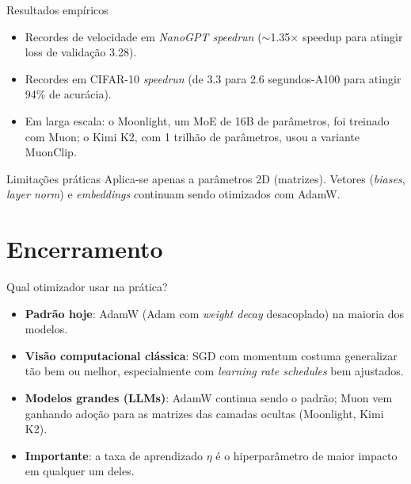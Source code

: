 \documentclass[aspectratio=169,xcolor=dvipsnames]{beamer}
\begin{document}
  \begin{frame}{Resultados empíricos}
    \begin{itemize}
      \item Recordes de velocidade em \textit{NanoGPT speedrun} ($\sim$1.35$\times$ speedup
        para atingir loss de validação 3.28).
      \item Recordes em CIFAR-10 \textit{speedrun} (de 3.3 para 2.6 segundos-A100 para
        atingir 94\% de acurácia).
      \item Em larga escala: o Moonlight, um MoE de 16B de
        parâmetros, foi treinado com Muon; o Kimi K2, com 1
        trilhão de parâmetros, usou a variante MuonClip.
    \end{itemize}
    \vfill
    \begin{alertblock}{Limitações práticas}
      Aplica-se apenas a parâmetros 2D (matrizes). Vetores (\textit{biases}, \textit{layer norm})
      e \textit{embeddings} continuam sendo otimizados com AdamW.
    \end{alertblock}
  \end{frame}

  \section{Encerramento}

  \begin{frame}{Qual otimizador usar na prática?}
    \begin{itemize}
      \item \textbf{Padrão hoje}: AdamW (Adam com \textit{weight decay} desacoplado) na maioria
        dos modelos.
      \item \textbf{Visão computacional clássica}: SGD com momentum costuma generalizar tão
        bem ou melhor, especialmente com \textit{learning rate schedules} bem ajustados.
      \item \textbf{Modelos grandes (LLMs)}: AdamW continua sendo o padrão; Muon vem
        ganhando adoção para as matrizes das camadas ocultas (Moonlight, Kimi K2).
      \item \textbf{Importante}: a taxa de aprendizado $\eta$ é o hiperparâmetro de maior
        impacto em qualquer um deles.
    \end{itemize}
  \end{frame}
\end{document}
